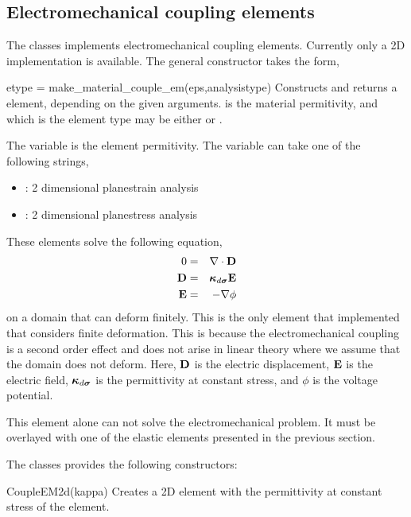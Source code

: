 \clearpage
\subsection{Electromechanical coupling elements}
The  classes implements electromechanical
coupling elements. Currently only a 2D implementation is available.
The general constructor takes the form,
\begin{codelist}
  \item[etype = make\_material\_couple\_em(eps,analysistype)]
    Constructs and returns a  element, depending on the
    given arguments.  is the material permitivity,
    and  which is the element type may be either 
     or .
\end{codelist}
The variable  is the element permitivity.
The variable  can take one of the 
following strings,
\begin{itemize}
\item {}: 2 dimensional planestrain analysis
\item {}: 2 dimensional planestress analysis
\end{itemize}
These elements solve the following equation,
\begin{eqnarray}
0
&=& \mathbf{\nabla}\cdot\mathbf{D} \\
\mathbf{D}  &=& \boldsymbol{\kappa}_{d\boldsymbol{\sigma}}\mathbf{E} \\
\mathbf{E}  &=&-\mathbf{\nabla}\phi
\end{eqnarray}
on a domain that can deform finitely. This is the only element that
implemented that considers finite deformation. This is because
the electromechanical coupling is a second order effect and does
not arise in linear theory where we assume that the domain does not
deform.
Here, $\mathbf{D}$ is the electric displacement, $\mathbf{E}$ is the electric field,
$\boldsymbol{\kappa}_{d\boldsymbol{\sigma}}$ is the permittivity at constant stress, and 
$\phi$ is the voltage potential.

This element alone can not solve the electromechanical problem. It must
be overlayed with one of the elastic elements presented in the previous
section. 

The classes provides the following constructors:
\begin{codelist}
  \item[CoupleEM2d(kappa)] Creates a 2D element with  the 
  permittivity at constant stress of the element.
\end{codelist}

